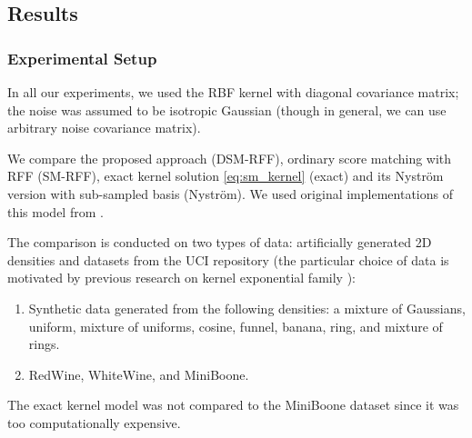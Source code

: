 \subsection{Results}
\label{chap:experiments}
\subsubsection{Experimental Setup}
In all our experiments, we used the RBF kernel with diagonal covariance matrix;
the noise was assumed to be isotropic Gaussian (though in general,
we can use arbitrary noise covariance matrix).

We compare the proposed approach (DSM-RFF),
ordinary score matching with RFF (SM-RFF),
exact kernel solution \eqref{eq:sm_kernel} (exact) and
its Nystr\"om version with sub-sampled basis \cite{sutherland2017efficient} (Nystr\"om).
We used original implementations of this model from \cite{GrettonGit}.

The comparison is conducted on two types of data: artificially generated 2D densities
and datasets from the UCI repository \cite{UCI}
(the particular choice of data is motivated by previous research on kernel exponential family
\cite{sutherland2017efficient, Gretton2015, GrettonDeep}):
\begin{enumerate}
    \item Synthetic data generated from the following densities: a mixture of Gaussians, uniform, mixture of uniforms, cosine, funnel, banana, ring, and mixture of rings.
    \item RedWine, WhiteWine, and MiniBoone.
\end{enumerate}
The exact kernel model was not compared to the MiniBoone dataset
since it was too computationally expensive.

